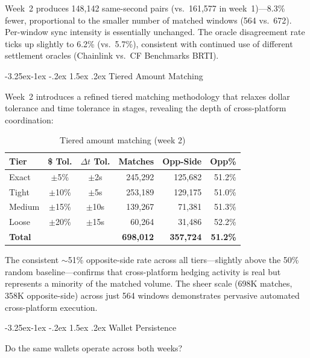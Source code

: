 \documentclass[11pt,a4paper]{article}
\makeatletter
\renewcommand\subsection{\@startsection{subsection}{2}{\z@}%
  {-3.25ex\@plus -1ex \@minus -.2ex}%
  {1.5ex \@plus .2ex}%
  {\normalfont\large\bfseries}}
\makeatother
\begin{document}
Week~2 produces 148,142 same-second pairs (vs.\ 161,577 in week~1)---8.3\% fewer, proportional to the smaller number of matched windows (564 vs.\ 672). Per-window sync intensity is essentially unchanged. The oracle disagreement rate ticks up slightly to 6.2\% (vs.\ 5.7\%), consistent with continued use of different settlement oracles (Chainlink vs.\ CF Benchmarks BRTI).

\subsection{Tiered Amount Matching}

Week~2 introduces a refined tiered matching methodology that relaxes dollar tolerance and time tolerance in stages, revealing the depth of cross-platform coordination:

\begin{table}[H]
\centering
\caption{Tiered amount matching (week 2)}
\label{tab:tiered_matching}
\begin{tabular}{@{}lccrrr@{}}
\toprule
\textbf{Tier} & \textbf{\$ Tol.} & \textbf{$\Delta t$ Tol.} & \textbf{Matches} & \textbf{Opp-Side} & \textbf{Opp\%} \\
\midrule
Exact   & $\pm$5\%  & $\pm$2s  & 245,292 & 125,682 & 51.2\% \\
Tight   & $\pm$10\% & $\pm$5s  & 253,189 & 129,175 & 51.0\% \\
Medium  & $\pm$15\% & $\pm$10s & 139,267 & 71,381  & 51.3\% \\
Loose   & $\pm$20\% & $\pm$15s & 60,264  & 31,486  & 52.2\% \\
\midrule
\textbf{Total} & & & \textbf{698,012} & \textbf{357,724} & \textbf{51.2\%} \\
\bottomrule
\end{tabular}
\end{table}

The consistent $\sim$51\% opposite-side rate across all tiers---slightly above the 50\% random baseline---confirms that cross-platform hedging activity is real but represents a minority of the matched volume. The sheer scale (698K matches, 358K opposite-side) across just 564 windows demonstrates pervasive automated cross-platform execution.

\subsection{Wallet Persistence}

Do the same wallets operate across both weeks?
\end{document}

